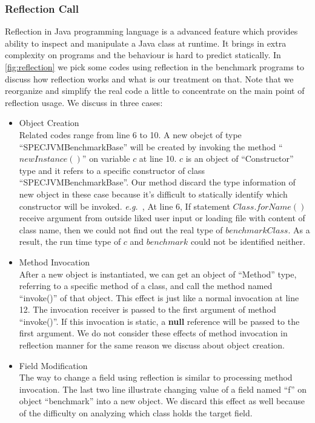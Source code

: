 \documentclass{fac}
\newcommand\eg{\textit{e.g.\ }}
\begin{document}
\subsubsection{Reflection Call}\label{subsubsec:reflection-call}
Reflection in Java programming language is a advanced feature which provides ability to inspect and manipulate a Java class at runtime. It brings in extra complexity on programs and the behaviour is hard to predict statically. In \ref{fig:reflection} we pick some codes using reflection in the benchmark programs to discuss how reflection works and what is our treatment on that. Note that we reorganize and simplify the real code a little to concentrate on the main point of reflection usage. We discuss in three cases:
\begin{itemize}
\item Object Creation \\
Related codes range from line 6 to 10. A new obejct of type ``SPECJVMBenchmarkBase'' will be created by invoking the method ``$newInstance()$'' on variable $c$ at line 10. $c$ is an object of ``Constructor'' type and it refers to a specific constructor of class ``SPECJVMBenchmarkBase''. Our method discard the type information of new object in these case because it's difficult to statically identify which constructor will be invoked. \eg, At line 6, If statement $Class.forName()$ receive argument from outside liked user input or loading file with content of class name, then we could not find out the real type of $benchmarkClass$. As a result, the run time type of $c$ and $benchmark$ could not be identified neither.
\item Method Invocation\\
After a new object is instantiated, we can get an object of ``Method'' type, referring to a specific method of a class, and call the method named ``invoke()'' of that object. This effect is just like a normal invocation at line 12. The invocation receiver is passed to the first argument of method ``invoke()''. If this invocation is static, a \textbf{null} reference will be passed to the first argument. We do not consider these effects of method invocation in reflection manner for the same reason we discuss about object creation.
\item Field Modification\\
The way to change a field using reflection is similar to processing method invocation. The last two line illustrate changing value of a field named ``f'' on object ``benchmark'' into a new object. We discard this effect as well because of the difficulty on analyzing which class holds the target field.
\end{itemize}
\end{document}
